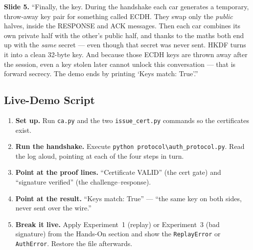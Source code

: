 \documentclass[11pt,a4paper]{report}
\begin{document}
\textbf{Slide 5.} ``Finally, the key. During the handshake each car generates a
temporary, throw-away key pair for something called ECDH. They swap only the
\emph{public} halves, inside the RESPONSE and ACK messages. Then each car
combines its own private half with the other's public half, and thanks to the
maths both end up with the \emph{same} secret --- even though that secret was
never sent. HKDF turns it into a clean 32-byte key. And because those ECDH keys
are thrown away after the session, even a key stolen later cannot unlock this
conversation --- that is forward secrecy. The demo ends by printing `Keys match:
True'.''

\subsection{Live-Demo Script}
\begin{enumerate}
  \item \textbf{Set up.} Run \texttt{ca.py} and the two \texttt{issue\_cert.py}
        commands so the certificates exist.
  \item \textbf{Run the handshake.} Execute \texttt{python
        protocol\textbackslash auth\_protocol.py}. Read the log aloud, pointing
        at each of the four steps in turn.
  \item \textbf{Point at the proof lines.} ``Certificate VALID'' (the cert gate)
        and ``signature verified'' (the challenge--response).
  \item \textbf{Point at the result.} ``Keys match: True'' --- ``the same key on
        both sides, never sent over the wire.''
  \item \textbf{Break it live.} Apply Experiment~1 (replay) or Experiment~3 (bad
        signature) from the Hands-On section and show the \texttt{ReplayError} or
        \texttt{AuthError}. Restore the file afterwards.
\end{enumerate}
\end{document}
